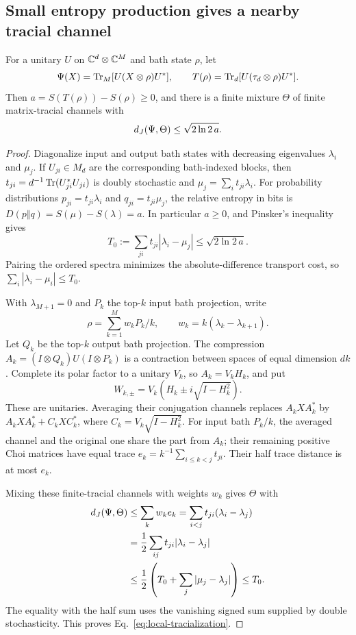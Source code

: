 \subsection{Small entropy production gives a nearby tracial channel}
\begin{lemma}\label{lem:tracialization}
For a unitary $U$ on $\mathbb C^d\otimes\mathbb C^M$ and bath state $\rho$, let
\[
 \Psi(X)=\operatorname{Tr}_M[U(X\otimes\rho)U^*],\qquad
 T(\rho)=\operatorname{Tr}_d[U(\tau_d\otimes\rho)U^*].
\]
Then $a=S(T(\rho))-S(\rho)\ge0$, and there is a finite mixture $\Theta$ of finite
matrix-tracial channels with
\begin{equation}
 d_J(\Psi,\Theta)\le\sqrt{2\ln2\,a}.
 \label{eq:local-tracialization}
\end{equation}
\end{lemma}
\begin{proof}
Diagonalize input and output bath states with decreasing eigenvalues $\lambda_i$ and
$\mu_j$. If $U_{ji}\in M_d$ are the corresponding bath-indexed blocks, then
$t_{ji}=d^{-1}\operatorname{Tr}(U_{ji}^*U_{ji})$ is doubly stochastic and
$\mu_j=\sum_it_{ji}\lambda_i$. For probability distributions
$p_{ji}=t_{ji}\lambda_i$ and $q_{ji}=t_{ji}\mu_j$, the relative entropy in bits is
$D(p\Vert q)=S(\mu)-S(\lambda)=a$. In particular $a\ge0$, and Pinsker's inequality gives
\[
 T_0:=\sum_{ji}t_{ji}|\lambda_i-\mu_j|\le\sqrt{2\ln2\,a}.
\]
Pairing the ordered spectra minimizes the absolute-difference transport cost, so
$\sum_i|\lambda_i-\mu_i|\le T_0$.

With $\lambda_{M+1}=0$ and $P_k$ the top-$k$ input bath projection, write
\[
 \rho=\sum_{k=1}^Mw_kP_k/k,\qquad w_k=k(\lambda_k-\lambda_{k+1}).
\]
Let $Q_k$ be the top-$k$ output bath projection. The compression
$A_k=(I\otimes Q_k)U(I\otimes P_k)$ is a contraction between spaces of equal dimension
$dk$. Complete its polar factor to a unitary $V_k$, so $A_k=V_kH_k$, and put
\[
 W_{k,\pm}=V_k(H_k\pm i\sqrt{I-H_k^2}).
\]
These are unitaries. Averaging their conjugation channels replaces $A_kXA_k^*$ by
$A_kXA_k^*+C_kXC_k^*$, where $C_k=V_k\sqrt{I-H_k^2}$.
For input bath $P_k/k$, the averaged channel and the original one share the part from
$A_k$; their remaining positive Choi matrices have equal trace
$e_k=k^{-1}\sum_{i\le k<j}t_{ji}$. Their half trace distance is at most $e_k$.

Mixing these finite-tracial channels with weights $w_k$ gives $\Theta$ with
\begin{align*}
 d_J(\Psi,\Theta)&\le\sum_kw_ke_k
 =\sum_{i<j}t_{ji}(\lambda_i-\lambda_j)\\
 &=\frac12\sum_{ij}t_{ji}|\lambda_i-\lambda_j|\\
 &\le\frac12\left(T_0+\sum_j|\mu_j-\lambda_j|\right)\le T_0.
\end{align*}
The equality with the half sum uses the vanishing signed sum supplied by double
stochasticity. This proves Eq.~\eqref{eq:local-tracialization}.
\end{proof}

